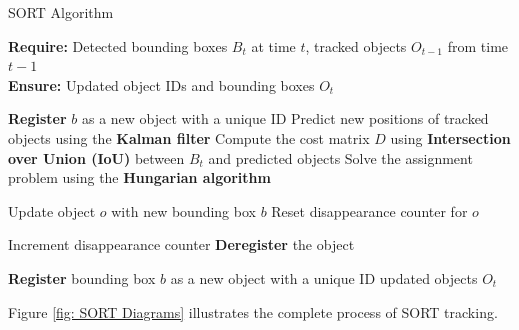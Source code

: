 \documentclass{CSSRforAfrica}
\begin{document}
\begin{algorithm}
	\caption{SORT Algorithm}
	\textbf{Require:} Detected bounding boxes $B_t$ at time $t$, tracked objects $O_{t-1}$ from time $t-1$ \\
	\textbf{Ensure:} Updated object IDs and bounding boxes $O_t$
	\begin{algorithmic}[1]
		\State \textbf{Register} $b$ as a new object with a unique ID
		\EndFor
		\Else
		\State Predict new positions of tracked objects using the \textbf{Kalman filter}
		\State Compute the cost matrix $D$ using \textbf{Intersection over Union (IoU)} between $B_t$ and predicted objects
		\State Solve the assignment problem using the \textbf{Hungarian algorithm}
		
		\State Update object $o$ with new bounding box $b$
		\State Reset disappearance counter for $o$
		\EndFor
		
		\State Increment disappearance counter
		\State \textbf{Deregister} the object
		\EndIf
		\EndFor
		
		\State \textbf{Register} bounding box $b$ as a new object with a unique ID
		\EndFor
		\EndIf
		\State \Return updated objects $O_t$
	\end{algorithmic}
\end{algorithm}
\vspace{-0.3cm}

Figure \ref{fig: SORT Diagrams} illustrates the complete process of SORT tracking.
\end{document}
